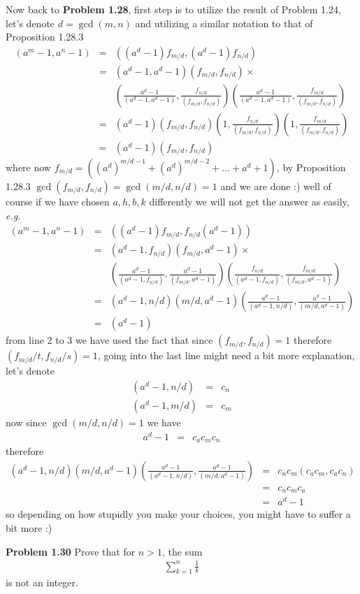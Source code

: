\documentclass[aps,preprint,preprintnumbers,nofootinbib,showpacs,prd]{revtex4-1}
\newcommand{\eg}{{\it e.g.} }
\newcommand{\nbea}{\begin{eqnarray*}}
\newcommand{\neea}{\end{eqnarray*}}
\begin{document}
Now back to {\bf Problem 1.28}, first step is to utilize the result of Problem 1.24, let's denote $d = \gcd(m,n)$ and utilizing a similar notation to that of Proposition 1.28.3
%
\nbea
(a^m-1,a^n-1) & = & ((a^d-1)f_{m/d},(a^d-1)f_{n/d}) \\
& = & (a^d-1,a^d-1)(f_{m/d},f_{n/d}) \times \\
&& \left ( \frac{a^d-1}{(a^d-1,a^d-1)},\frac{f_{n/d}}{(f_{m/d},f_{n/d})}\right )\left ( \frac{a^d-1}{(a^d-1,a^d-1)},\frac{f_{m/d}}{(f_{m/d},f_{n/d})}\right ) \\
& = & (a^d-1)(f_{m/d},f_{n/d}) \left ( 1, \frac{f_{n/d}}{(f_{m/d},f_{n/d})}\right )\left ( 1,\frac{f_{m/d}}{(f_{m/d},f_{n/d})}\right ) \\
& = & (a^d-1)(f_{m/d},f_{n/d})
\neea
%
where now $f_{m/d} = \left ( (a^d)^{m/d-1} + (a^d)^{m/d-2} + \ldots + a^d + 1 \right )$, by Proposition 1.28.3 $\gcd(f_{m/d},f_{n/d}) = \gcd(m/d,n/d)=1$ and we are done :) well of course if we have chosen $a,h,b,k$ differently we will not get the answer as easily, \eg 
%
\nbea
(a^m-1,a^n-1) & = & ((a^d-1)f_{m/d},f_{n/d}(a^d-1)) \\
& = & (a^d-1,f_{n/d})(f_{m/d},a^d-1) \times \\
&& \left ( \frac{a^d-1}{(a^d-1,f_{n/d})},\frac{a^d-1}{(f_{m/d},a^d-1)}\right )\left ( \frac{f_{n/d}}{(a^d-1,f_{n/d})},\frac{f_{m/d}}{(f_{m/d},a^d-1)}\right ) \\
& = & (a^d-1,n/d)(m/d,a^d-1) \left ( \frac{a^d-1}{(a^d-1,n/d)},\frac{a^d-1}{(m/d,a^d-1)}\right ) \\
& = & (a^d-1)
\neea
%
from line 2 to 3 we have used the fact that since $(f_{m/d},f_{n/d}) = 1$ therefore $(f_{m/d}/t,f_{n/d}/s) = 1$, going into the last line might need a bit more explanation, let's denote
%
\nbea
(a^d-1,n/d) & = & c_n \\
(a^d-1,m/d) & = & c_m
\neea
%
now since $\gcd(m/d,n/d)=1$ we have
%
\nbea
a^d - 1 & = & c_a c_m c_n
\neea
%
therefore
%
\nbea
(a^d-1,n/d)(m/d,a^d-1) \left ( \frac{a^d-1}{(a^d-1,n/d)},\frac{a^d-1}{(m/d,a^d-1)}\right ) & = & c_n c_m (c_a c_m, c_a c_n)\\
& = & c_n c_m c_a \\
& = & a^d - 1
\neea
%
so depending on how stupidly you make your choices, you might have to suffer a bit more :)

{\bf Problem 1.30} Prove that for $n > 1$, the sum
%
\nbea
\sum_{k=1}^n \frac{1}{k}
\neea
%
is not an integer.
\end{document}
